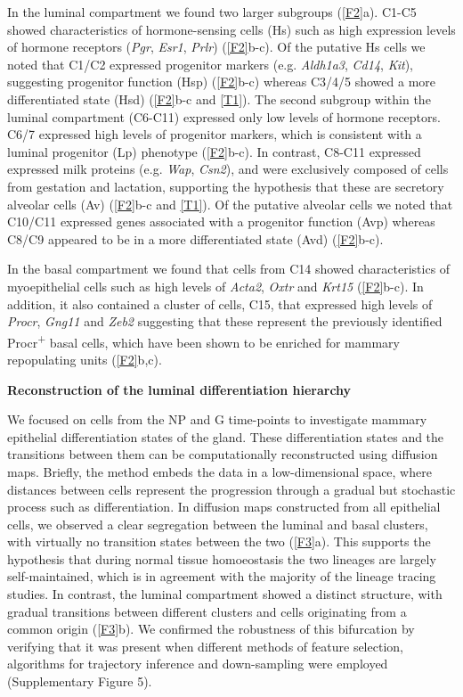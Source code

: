 \documentclass[titlepage, 12pt, oneside]{amsart}
\begin{document}
In the luminal compartment we found two larger subgroups (\autoref{F2}a).
C1-C5 showed characteristics of hormone-sensing cells (Hs) such as high expression levels of hormone receptors (\textit{Pgr}, \textit{Esr1}, \textit{Prlr}) (\autoref{F2}b-c).
Of the putative Hs cells we noted that C1/C2 expressed progenitor markers (e.g. \textit{Aldh1a3}, \textit{Cd14}, \textit{Kit})\autocite{Shehata2012}, suggesting progenitor function (Hsp) (\autoref{F2}b-c) whereas C3/4/5 showed a more differentiated state (Hsd) (\autoref{F2}b-c and \autoref{T1}).
The second subgroup within the luminal compartment (C6-C11) expressed only low levels of hormone receptors.
C6/7 expressed high levels of progenitor markers, which is consistent with a luminal progenitor (Lp) phenotype (\autoref{F2}b-c).
In contrast, C8-C11 expressed expressed milk proteins (e.g. \textit{Wap}, \textit{Csn2}), and were exclusively composed of cells from gestation and lactation, supporting the hypothesis that these are secretory alveolar cells (Av) (\autoref{F2}b-c and \autoref{T1}).
Of the putative alveolar cells we noted that C10/C11 expressed genes associated with a progenitor function (Avp) whereas C8/C9 appeared to be in a more differentiated state (Avd) (\autoref{F2}b-c).

In the basal compartment we found that cells from C14 showed characteristics of myoepithelial cells such as high levels of \textit{Acta2}, \textit{Oxtr} and \textit{Krt15} (\autoref{F2}b-c).
In addition, it also contained a cluster of cells, C15, that expressed high levels of \textit{Procr}, \textit{Gng11} and \textit{Zeb2} suggesting that these represent the previously identified Procr\textsuperscript{+}  basal cells, which have been shown to be enriched for mammary repopulating units\autocite{Wang2015} (\autoref{F2}b,c).

\textbf{Reconstruction of the luminal differentiation hierarchy}

We focused on cells from the NP and G time-points to investigate mammary epithelial differentiation states of the gland.
These differentiation states and the transitions between them can be computationally reconstructed using diffusion maps.
Briefly, the method embeds the data in a low-dimensional space, where distances between cells represent the progression through a gradual but stochastic process such as differentiation.
In diffusion maps constructed from all epithelial cells, we observed a clear segregation between the luminal and basal clusters, with virtually no transition states between the two (\autoref{F3}a).
This supports the hypothesis that during normal tissue homoeostasis the two lineages are largely self-maintained, which is in agreement with the majority of the lineage tracing studies\autocite{VanKeymeulen2011,VanAmerongen2012,Davis2016}.
In contrast, the luminal compartment showed a distinct structure, with gradual transitions between different clusters and cells originating from a common origin (\autoref{F3}b).
We confirmed the robustness of this bifurcation by verifying that it was present when different methods of feature selection, algorithms for trajectory inference and down-sampling were employed (Supplementary Figure 5).
\end{document}
